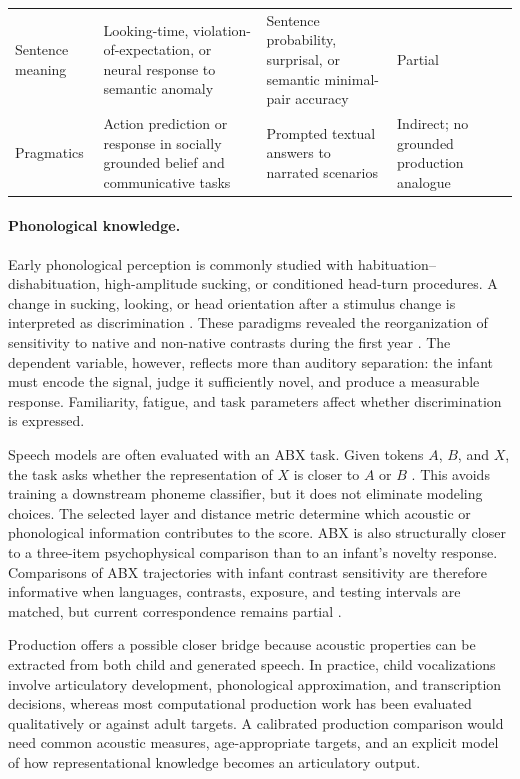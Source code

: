 \begin{longtable}{@{}p{}p{}p{}p{}p{}@{}}
Sentence meaning & Looking-time, violation-of-expectation, or neural response to semantic anomaly & Sentence probability, surprisal, or semantic minimal-pair accuracy & Partial & \citep{Margoni2023,friedrich2006early,kauf2023event,michaelov2024strong} \\
Pragmatics & Action prediction or response in socially grounded belief and communicative tasks & Prompted textual answers to narrated scenarios & Indirect; no grounded production analogue & \citep{WimmerPerner1983,Wellman2001,Kosinski2023,Strachan2024} \\
\end{longtable}
\endgroup

\paragraph{Phonological knowledge.}
Early phonological perception is commonly studied with habituation--dishabituation, high-amplitude sucking, or conditioned head-turn procedures. A change in sucking, looking, or head orientation after a stimulus change is interpreted as discrimination \citep{Eimas1971,Best1988,Kuhl1992,Sundara2018}. These paradigms revealed the reorganization of sensitivity to native and non-native contrasts during the first year \citep{Werker1984,tsuji2014perceptual}. The dependent variable, however, reflects more than auditory separation: the infant must encode the signal, judge it sufficiently novel, and produce a measurable response. Familiarity, fatigue, and task parameters affect whether discrimination is expressed.

Speech models are often evaluated with an ABX task. Given tokens $A$, $B$, and $X$, the task asks whether the representation of $X$ is closer to $A$ or $B$ \citep{Schatz2013,Schatz2014,dunbar2021zero,Lavechin2023BabySLM}. This avoids training a downstream phoneme classifier, but it does not eliminate modeling choices. The selected layer and distance metric determine which acoustic or phonological information contributes to the score. ABX is also structurally closer to a three-item psychophysical comparison than to an infant's novelty response. Comparisons of ABX trajectories with infant contrast sensitivity are therefore informative when languages, contrasts, exposure, and testing intervals are matched, but current correspondence remains partial \citep{schatz2021early,matusevych2023infant,poli2024modeling}.

Production offers a possible closer bridge because acoustic properties can be extracted from both child and generated speech. In practice, child vocalizations involve articulatory development, phonological approximation, and transcription decisions, whereas most computational production work has been evaluated qualitatively or against adult targets. A calibrated production comparison would need common acoustic measures, age-appropriate targets, and an explicit model of how representational knowledge becomes an articulatory output.

